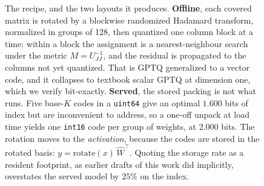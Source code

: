 \begin{figure}[t]
{}
\caption{The recipe, and the two layouts it produces. \textbf{Offline}, each
covered matrix is rotated by a blockwise randomized Hadamard transform,
normalized in groups of 128, then quantized one column block at a time: within a
block the assignment is a nearest-neighbour search under the metric
$M = U_{JJ}^{-1}$, and the residual is propagated to the columns not yet
quantized. That is GPTQ generalized to a vector code, and it collapses to
textbook scalar GPTQ at dimension one, which we verify bit-exactly.
\textbf{Served}, the stored packing is not what runs. Five base-$K$ codes in a
\texttt{uint64} give an optimal $1.600$ bits of index but are inconvenient to
address, so a one-off unpack at load time yields one \texttt{int16} code per
group of weights, at $2.000$ bits. The rotation moves to the \emph{activation},
because the codes are stored in the rotated basis:
$y = \mathrm{rotate}(x)\,\widehat{W}^{\top}$. Quoting the storage rate as a
resident footprint, as earlier drafts of this work did implicitly, overstates
the served model by $25\%$ on the index.}
\label{fig:method}
\end{figure}
